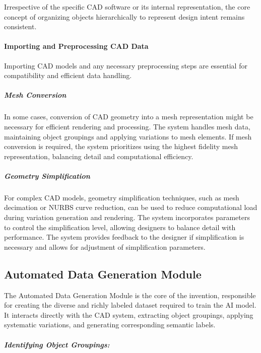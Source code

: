 \documentclass[12pt]{report}
\begin{document}
Irrespective of the specific CAD software or its internal representation, the core concept of organizing objects hierarchically to represent design intent remains consistent.

\paragraph{Importing and Preprocessing CAD Data}
Importing CAD models and any necessary preprocessing steps are essential for compatibility and efficient data handling.

\subparagraph{Mesh Conversion}

In some cases, conversion of CAD geometry into a mesh representation might be necessary for efficient rendering and processing. The system handles mesh data, maintaining object groupings and applying variations to mesh elements. If mesh conversion is required, the system prioritizes using the highest fidelity mesh representation, balancing detail and computational efficiency.

\subparagraph{Geometry Simplification}
For complex CAD models, geometry simplification techniques, such as mesh decimation or NURBS curve reduction, can be used to reduce computational load during variation generation and rendering.  The system incorporates parameters to control the simplification level, allowing designers to balance detail with performance. The system provides feedback to the designer if simplification is necessary and allows for adjustment of simplification parameters.

\subsection{Automated Data Generation Module}

The Automated Data Generation Module is the core of the invention, responsible for creating the diverse and richly labeled dataset required to train the AI model. It interacts directly with the CAD system, extracting object groupings, applying systematic variations, and generating corresponding semantic labels.

\subparagraph{Identifying Object Groupings:} 
\end{document}
